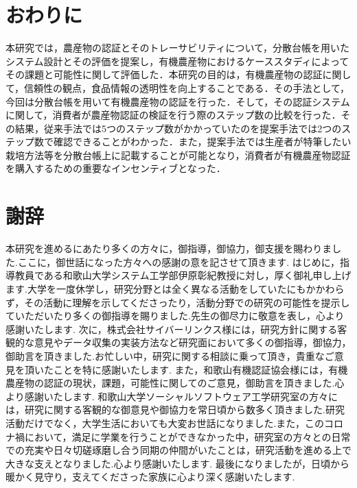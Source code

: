 \documentclass[11pt,dvipdfmx]{jreport}
\begin{document}
\chapter{おわりに}
本研究では，農産物の認証とそのトレーサビリティについて，分散台帳を用いたシステム設計とその評価を提案し，有機農産物におけるケーススタディによってその課題と可能性に関して評価した．本研究の目的は，有機農産物の認証に関して，信頼性の観点，食品情報の透明性を向上することである．その手法として，今回は分散台帳を用いて有機農産物の認証を行った．そして，その認証システムに関して，消費者が農産物認証の検証を行う際のステップ数の比較を行った．その結果，従来手法では5つのステップ数がかかっていたのを提案手法では2つのステップ数で確認できることがわかった．また，提案手法では生産者が特筆したい栽培方法等を分散台帳上に記載することが可能となり，消費者が有機農産物認証を購入するための重要なインセンティブとなった．

\chapter*{謝辞}
本研究を進めるにあたり多くの方々に，御指導，御協力，御支援を賜わりました.ここに，御世話になった方々への感謝の意を記させて頂きます.
はじめに，指導教員である和歌山大学システム工学部伊原彰紀教授に対し，厚く御礼申し上げます.大学を一度休学し，研究分野とは全く異なる活動をしていたにもかかわらず，その活動に理解を示してくださったり，活動分野での研究の可能性を提示していただいたり多くの御指導を賜りました.先生の御尽力に敬意を表し，心より感謝いたします.
次に，株式会社サイバーリンクス様には，研究方針に関する客観的な意見やデータ収集の実装方法など研究面において多くの御指導，御協力，御助言を頂きました.お忙しい中，研究に関する相談に乗って頂き，貴重なご意見を頂いたことを特に感謝いたします.
また，和歌山有機認証協会様には，有機農産物の認証の現状，課題，可能性に関してのご意見，御助言を頂きました.心より感謝いたします.
和歌山大学ソーシャルソフトウェア工学研究室の方々には，研究に関する客観的な御意見や御協力を常日頃から数多く頂きました.研究活動だけでなく，大学生活においても大変お世話になりました.また，このコロナ禍において，満足に学業を行うことができなかった中，研究室の方々との日常での充実や日々切磋琢磨し合う同期の仲間がいたことは，研究活動を進める上で大きな支えとなりました.心より感謝いたします.
最後になりましたが，日頃から暖かく見守り，支えてくださった家族に心より深く感謝いたします.




\end{document}
